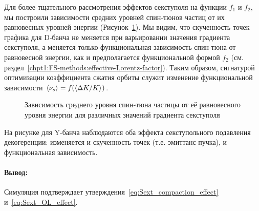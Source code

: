 Для более тщательного рассмотрения эффектов секступоля на функции $f_1$ и $f_2$, мы построили зависимости средних уровней спин-тюнов частиц от их равновесных уровней энергии (Рисунок~\ref{fig:ST_vs_dkok_for_sext_strenghts}). Мы видим, что скученность точек графика для D-банча не меняется при варьировании значения градиента секступоля, а меняется только функциональная зависимость спин-тюна от равновесной энергии, как и предполагается функциональной формой $f_2$ (см. раздел~\ref{chpt1:FS-methods:effective-Lorentz-factor}). Таким образом, сигнатурой оптимизации коэффициента сжатия орбиты служит изменение функциональной зависимости ${\avg{\nu_s} = f(\avg{\Delta K/K})}$.

\begin{figure}[H]
	\centering
\end{figure}
\begin{figure}[H]\centering
	\caption{Зависимость среднего уровня спин-тюна частицы от её равновесного уровня энергии для различных значений градиента секступоля\label{fig:ST_vs_dkok_for_sext_strenghts}}
\end{figure}

На рисунке для Y-банча наблюдаются оба эффекта секступольного подавления декогеренции: изменяется и скученность точек (т.е. эмиттанс пучка), и функциональная зависимость.

\paragraph{Вывод:} Симуляция подтверждает утверждения~\eqref{eq:Sext_compaction_effect} и~\eqref{eq:Sext_OL_effect}.